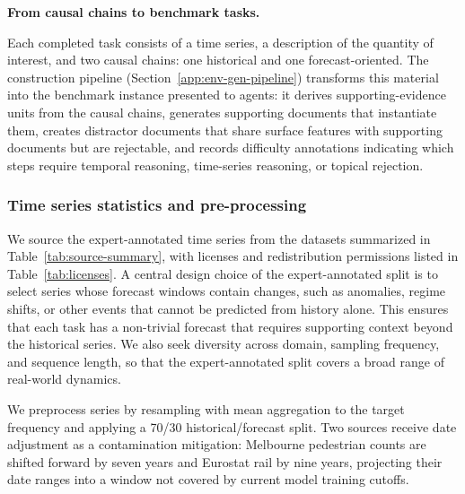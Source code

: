\documentclass[]{servicenow}
\newcommand{\paragraphtight}[1]{%
  \par\vspace{-0.75\parskip}\vspace{0.3em}%
  \noindent\textbf{#1}\hspace{0.4em}\ignorespaces
}
\begin{document}
\paragraphtight{From causal chains to benchmark tasks.}
Each completed task consists of a time series, a description of the quantity of interest, and two causal chains: one historical and one forecast-oriented.
The construction pipeline (Section~\ref{app:env-gen-pipeline}) transforms this material into the benchmark instance presented to agents: it derives supporting-evidence units from the causal chains, generates supporting documents that instantiate them, creates distractor documents that share surface features with supporting documents but are rejectable, and records difficulty annotations indicating which steps require temporal reasoning, time-series reasoning, or topical rejection.


\subsubsection{Time series statistics and pre-processing}
\label{app:expert-ts-stats}

We source the expert-annotated time series from the datasets summarized in Table~\ref{tab:source-summary}, with licenses and redistribution permissions listed in Table~\ref{tab:licenses}.
A central design choice of the expert-annotated split is to select series whose forecast windows contain changes, such as anomalies, regime shifts, or other events that cannot be predicted from history alone.
This ensures that each task has a non-trivial forecast that requires supporting context beyond the historical series.
We also seek diversity across domain, sampling frequency, and sequence length, so that the expert-annotated split covers a broad range of real-world dynamics.

We preprocess series by resampling with mean aggregation to the target frequency and applying a 70/30 historical/forecast split.
Two sources receive date adjustment as a contamination mitigation: Melbourne pedestrian counts are shifted forward by seven years and Eurostat rail by nine years, projecting their date ranges into a window not covered by current model training cutoffs.
\end{document}
